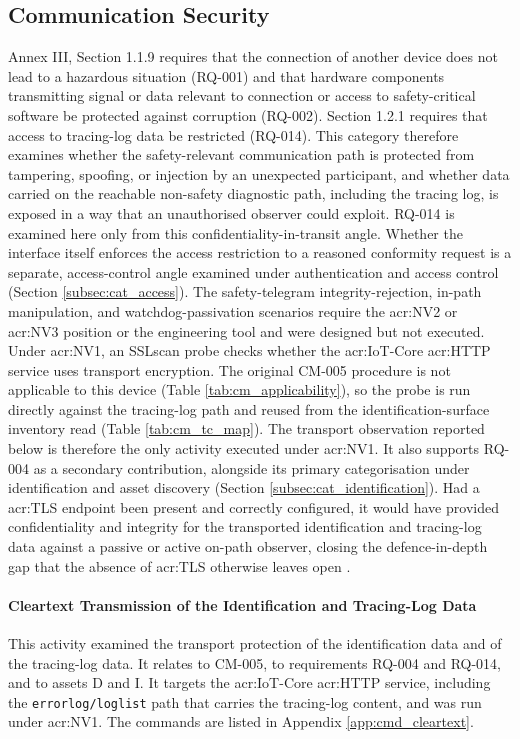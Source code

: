 \subsection{Communication Security}
\label{subsec:cat_communication}
Annex III, Section 1.1.9 requires that the connection of another device does not lead to a hazardous situation (RQ-001) and that hardware components transmitting signal or data relevant to connection or access to safety-critical software be protected against corruption (RQ-002). Section 1.2.1 requires that access to tracing-log data be restricted (RQ-014). This category therefore examines whether the safety-relevant communication path is protected from tampering, spoofing, or injection by an unexpected participant, and whether data carried on the reachable non-safety diagnostic path, including the tracing log, is exposed in a way that an unauthorised observer could exploit. RQ-014 is examined here only from this confidentiality-in-transit angle. Whether the interface itself enforces the access restriction to a reasoned conformity request is a separate, access-control angle examined under authentication and access control (Section \ref{subsec:cat_access}). The safety-telegram integrity-rejection, in-path manipulation, and watchdog-passivation scenarios require the \gls{acr:NV2} or \gls{acr:NV3} position or the engineering tool and were designed but not executed. Under \gls{acr:NV1}, an SSLscan probe checks whether the \gls{acr:IoT}-Core \gls{acr:HTTP} service uses transport encryption. The original CM-005 procedure is not applicable to this device (Table \ref{tab:cm_applicability}), so the probe is run directly against the tracing-log path and reused from the identification-surface inventory read (Table \ref{tab:cm_tc_map}). The transport observation reported below is therefore the only activity executed under \gls{acr:NV1}. It also supports RQ-004 as a secondary contribution, alongside its primary categorisation under identification and asset discovery (Section \ref{subsec:cat_identification}). Had a \gls{acr:TLS} endpoint been present and correctly configured, it would have provided confidentiality and integrity for the transported identification and tracing-log data against a passive or active on-path observer, closing the defence-in-depth gap that the absence of \gls{acr:TLS} otherwise leaves open \cite{ietf-tls-rfc8446bis-10}.

\paragraph{Cleartext Transmission of the Identification and Tracing-Log Data}
\label{subsec:res_cleartext}
This activity examined the transport protection of the identification data and of the tracing-log data. It relates to CM-005, to requirements RQ-004 and RQ-014, and to assets D and I. It targets the \gls{acr:IoT}-Core \gls{acr:HTTP} service, including the \texttt{errorlog/loglist} path that carries the tracing-log content, and was run under \gls{acr:NV1}. The commands are listed in Appendix \ref{app:cmd_cleartext}.

